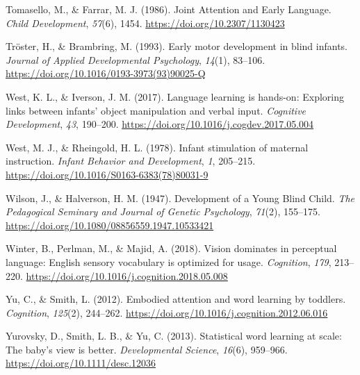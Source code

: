 \documentclass[
  man,floatsintext]{apa6}
\newlength{\cslhangindent}
\newlength{\cslentryspacingunit} %
\newenvironment{CSLReferences}[2] %
 {%
  \setlength{\parindent}{0pt}
  \ifodd #1
  \let\oldpar\par
  \def\par{\hangindent=\cslhangindent\oldpar}
  \fi
  \setlength{\parskip}{#2\cslentryspacingunit}
 }%
 {}
\begin{document}
\begin{CSLReferences}{1}{0}
\leavevmode{}%
Tomasello, M., \& Farrar, M. J. (1986). Joint {Attention} and {Early Language}. \emph{Child Development}, \emph{57}(6), 1454. \url{https://doi.org/10.2307/1130423}

\leavevmode{}%
Tröster, H., \& Brambring, M. (1993). Early motor development in blind infants. \emph{Journal of Applied Developmental Psychology}, \emph{14}(1), 83--106. \url{https://doi.org/10.1016/0193-3973(93)90025-Q}

\leavevmode{}%
West, K. L., \& Iverson, J. M. (2017). Language learning is hands-on: {Exploring} links between infants' object manipulation and verbal input. \emph{Cognitive Development}, \emph{43}, 190--200. \url{https://doi.org/10.1016/j.cogdev.2017.05.004}

\leavevmode{}%
West, M. J., \& Rheingold, H. L. (1978). Infant stimulation of maternal instruction. \emph{Infant Behavior and Development}, \emph{1}, 205--215. \url{https://doi.org/10.1016/S0163-6383(78)80031-9}

\leavevmode{}%
Wilson, J., \& Halverson, H. M. (1947). Development of a {Young Blind Child}. \emph{The Pedagogical Seminary and Journal of Genetic Psychology}, \emph{71}(2), 155--175. \url{https://doi.org/10.1080/08856559.1947.10533421}

\leavevmode{}%
Winter, B., Perlman, M., \& Majid, A. (2018). Vision dominates in perceptual language: {English} sensory vocabulary is optimized for usage. \emph{Cognition}, \emph{179}, 213--220. \url{https://doi.org/10.1016/j.cognition.2018.05.008}

\leavevmode{}%
Yu, C., \& Smith, L. (2012). Embodied attention and word learning by toddlers. \emph{Cognition}, \emph{125}(2), 244--262. \url{https://doi.org/10.1016/j.cognition.2012.06.016}

\leavevmode{}%
Yurovsky, D., Smith, L. B., \& Yu, C. (2013). Statistical word learning at scale: The baby's view is better. \emph{Developmental Science}, \emph{16}(6), 959--966. \url{https://doi.org/10.1111/desc.12036}

\end{CSLReferences}
\end{document}
